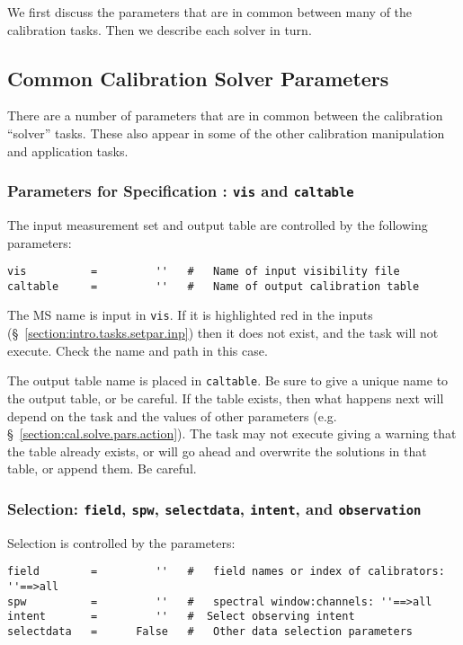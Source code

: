 We first discuss the parameters that are in common between many
of the calibration tasks.  Then we describe each solver in turn.

\subsection{Common Calibration Solver Parameters}
\label{section:cal.solve.pars}

There are a number of parameters that are in common between 
the calibration ``solver'' tasks.  These also appear in some
of the other calibration manipulation and application tasks.

\subsubsection{Parameters for Specification : {\tt vis} and
{\tt caltable} }
\label{section:cal.solve.pars.spec}

The input measurement set and output table are
controlled by the following parameters:
\small
\begin{verbatim}
vis          =         ''   #   Name of input visibility file
caltable     =         ''   #   Name of output calibration table
\end{verbatim}
\normalsize

The MS name is input in {\tt vis}.  If it is highlighted red
in the inputs (\S~\ref{section:intro.tasks.setpar.inp}) then it 
does not exist, and the task will not execute.  Check the name and
path in this case. 

The output table name is placed in {\tt caltable}.  Be sure to give a
unique name to the output table, or be careful.  If the table exists,
then what happens next will depend on the task and the values of other
parameters (e.g.  \S~\ref{section:cal.solve.pars.action}).  The task
may not execute giving a warning that the table already exists, or
will go ahead and overwrite the solutions in that table, or append
them.  Be careful.

\subsubsection{Selection: {\tt field}, {\tt spw}, {\tt selectdata},
  {\tt intent}, and {\tt observation} }
\label{section:cal.solve.pars.select}

Selection is controlled by the parameters:
\small
\begin{verbatim}
field        =         ''   #   field names or index of calibrators: ''==>all
spw          =         ''   #   spectral window:channels: ''==>all 
intent       =         ''   #  Select observing intent
selectdata   =      False   #   Other data selection parameters
\end{verbatim}
\normalsize

